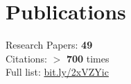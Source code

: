 \documentclass[]{junhu_resume}
\begin{document}
\begin{minipage}[t]{0.28\textwidth}

\section{Publications} 
Research Papers: \textbf{49}\\
Citations: $>$ \textbf{700} times\\
Full list: \href{https://scholar.google.com/citations?user=Vr8dYJsAAAAJ}{bit.ly/2xVZYic}
\sectionsep










\end{minipage}
\end{document}
